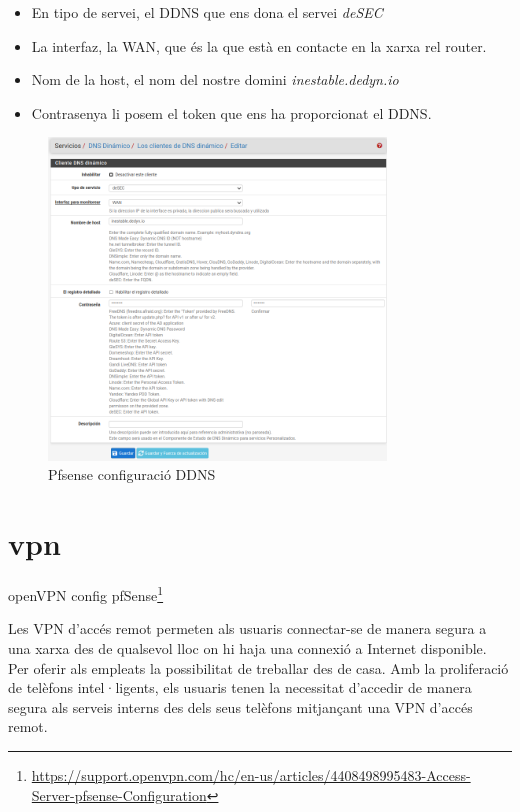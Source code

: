 \documentclass[
  10pt,
]{krantz}
\DeclareRobustCommand{\href}[2]{#2\footnote{\url{#1}}}
\providecommand{\tightlist}{%
  \setlength{\itemsep}{0pt}\setlength{\parskip}{0pt}}
\begin{document}
\begin{itemize}
\tightlist
\item
  En tipo de servei, el DDNS que ens dona el servei \emph{deSEC}
\item
  La interfaz, la WAN, que és la que està en contacte en la xarxa rel router.
\item
  Nom de la host, el nom del nostre domini \emph{inestable.dedyn.io}
\item
  Contrasenya li posem el token que ens ha proporcionat el DDNS.
\end{itemize}

\begin{figure}
\centering
\includegraphics[width=0.8\textwidth,height=\textheight]{imatges/proxmox/pfsense_DDNS.png}
\caption{Pfsense configuració DDNS}
\end{figure}

\hypertarget{vpn}{%
\section{vpn}\label{vpn}}

\href{https://support.openvpn.com/hc/en-us/articles/4408498995483-Access-Server-pfsense-Configuration}{openVPN config pfSense}

Les VPN d'accés remot permeten als usuaris connectar-se de manera segura a una xarxa des de qualsevol lloc on hi haja una connexió a Internet disponible. Per oferir als empleats la possibilitat de treballar des de casa. Amb la proliferació de telèfons intel·ligents, els usuaris tenen la necessitat d'accedir de manera segura als serveis interns des dels seus telèfons mitjançant una VPN d'accés remot.
\end{document}
